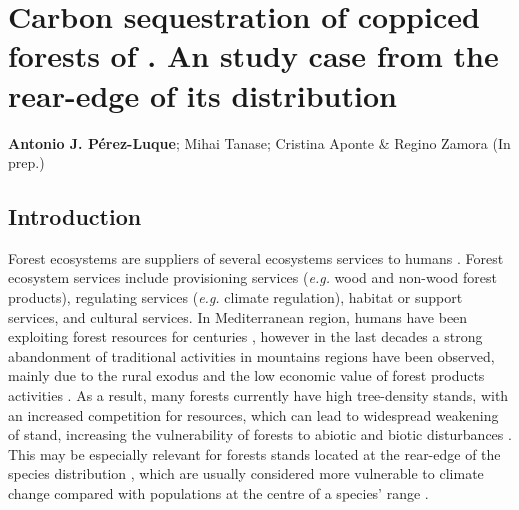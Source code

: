 %
\chapter{\textcolor{ctcolormain}{Carbon sequestration of coppiced forests of \Qp. An study case from the rear-edge of its distribution}}\label{sec:carbon}

\mbox{}
\vfill
{\color{ctcolormain}\textbf{Antonio J. Pérez-Luque}}; Mihai Tanase; Cristina Aponte \& Regino Zamora (In prep.)

\newpage

\section{Introduction}\label{sec:carbon:intro}

Forest ecosystems are suppliers of several ecosystems services to humans \autocite{Iversonetal2018EcosystemServices,MartinezPasturetal2018EcosystemServices,NoceSantini2018MediterraneanForest}. Forest ecosystem services include provisioning services (\emph{e.g.} wood and non-wood forest products), regulating services (\emph{e.g.} climate regulation), habitat or support services, and cultural services. In Mediterranean region, humans have been exploiting forest resources for centuries \autocite{ValbuenaCarabanaetal2010HistoricalRecent}, however in the last decades a strong abandonment of traditional activities in mountains regions have been observed, mainly due to the rural exodus and the low economic value of forest products activities \autocite{Chauchardetal2007PatternsLanduse,Debusscheetal1999MediterraneanLandscape,MacDonaldetal2000AgriculturalAbandonment}. As a result, many forests currently have high tree-density stands, with an increased competition for resources, which can lead to widespread weakening of stand, increasing the vulnerability of forests to abiotic and biotic disturbances \autocite{Tardieuetal2018HumanNeeds}. This may be especially relevant for forests stands located at the rear-edge of the species distribution \autocite{HampePetit2005ConservingBiodiversity}, which are usually considered more vulnerable to climate change compared with populations at the centre of a species' range \autocite{Fadyetal2016EvolutionbasedApproach,Pirononetal2017GeographicVariation,Rehmetal2015LosingYour}.

